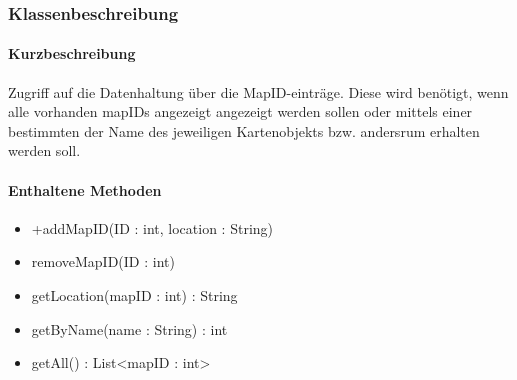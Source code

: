 \subsubsection*{Klassenbeschreibung}%
\paragraph*{Kurzbeschreibung}
Zugriff auf die Datenhaltung über die MapID-einträge. Diese wird benötigt, wenn alle vorhanden mapIDs angezeigt angezeigt werden sollen oder
mittels einer bestimmten der Name des jeweiligen Kartenobjekts bzw. andersrum erhalten werden soll.

\paragraph*{Enthaltene Methoden}
\begin{itemize}
    \item +addMapID(ID : int, location : String)
    \item removeMapID(ID : int)
    \item getLocation(mapID : int) : String
    \item getByName(name : String) : int
    \item getAll() : List<mapID : int>
\end{itemize}
